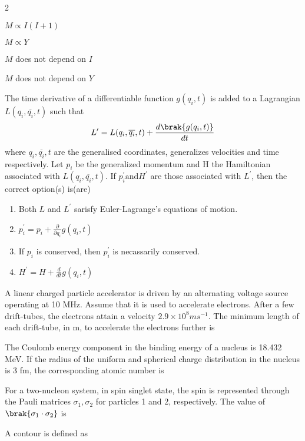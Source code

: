 		\begin{enumerate}
		\end{enumerate}
	\item The time derivative of a differentiable function $g(q_{i},t)$ is added to a Lagrangian $L(q_i, \overline{q_i},t)$ such that
		$$ L^{\prime} = L(q_i, \overline{q_i}, t) + \frac{d\brak{g(q_i,t)}}{dt} $$
		where $q_i, \overline{q_i}, t$ are the generalised coordinates, generalizes velocities and time respectively. Let $p_i$ be the generalized momentum and H the Hamiltonian associated with $L(q_i, \overline{q_i}, t)$. If $p_{i}^{\prime} \text{and} H^{\prime}$ are those associated with $L^{\prime}$, then the correct option(s) is(are)
		\begin{enumerate}
			\item Both $L$ and $L^{\prime}$ sarisfy Euler-Lagrange's equations of motion.
			\item $p_{i}^{\prime} = p_i + \frac{\partial}{\partial q_i} g(q_i,t) $
			\item If $p_i$ is conserved, then $p_{i}^{\prime}$ is necassarily conserved.
			\item $H^{\prime} = H + \frac{d}{dt} g(q_i, t) $
		\end{enumerate}
	\item A linear charged particle accelerator is driven by an alternating voltage source operating at 10 MHz. Assume that it is used to accelerate electrons. After a few drift-tubes, the electrons attain a velocity $2.9 \times 10^8 ms^{-1}$. The minimum length of each drift-tube, in m, to accelerate the electrons further is \underline{   }
	\item The Coulomb energy component in the binding energy of a nucleus is 18.432 MeV. If the radius of the uniform and spherical charge distribution in the nucleus is 3 fm, the corresponding atomic number is \underline{  }
	\item For a two-nucleon system, in spin singlet state, the spin is represented through the Pauli matrices $\sigma_1, \sigma_2$ for particles 1 and 2, respectively. The value of $\brak{\sigma_1 \cdot \sigma_2}$ is
	\item A contour is defined as 
